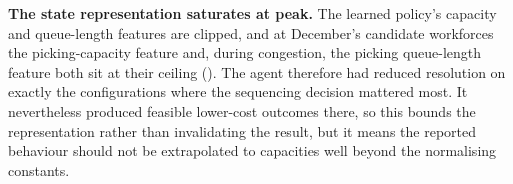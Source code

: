 \textbf{The state representation saturates at peak.} The learned policy's capacity and
queue-length features are clipped, and at December's candidate workforces the picking-capacity
feature and, during congestion, the picking queue-length feature both sit at their ceiling
(). The agent therefore had reduced resolution on exactly the
configurations where the sequencing decision mattered most. It nevertheless produced feasible
lower-cost outcomes there, so this bounds the representation rather than invalidating the
result, but it means the reported behaviour should not be extrapolated to capacities well beyond
the normalising constants.

